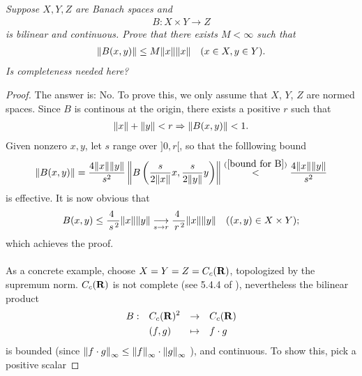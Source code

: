 \textit{
Suppose $X,Y,Z$ are Banach spaces and 
%
\begin{align*}
  B:X\times Y \to Z
\end{align*}
%
is bilinear and continuous. Prove that there exists $M<\infty$ such that 
%
\begin{align*}
  \norm{B(x, y)}
  \leq 
  M \norm{x}\norm{x} \quad (x\in X, y\in Y).
\end{align*}
%
Is completeness needed here?}
\begin{proof}%
The answer is: No. To prove this, we only assume that %
%
  $\mathit{X}$, $\mathit{Y}$, $\mathit{Z}$ %
%
are normed spaces. %
%
Since $B$ is continous at the origin, there exists a positive $r$ %
such that %
%
\begin{align}\label{bound for B}
  \norm{x} + \norm{y} < r \Rightarrow %
  \norm{B(x, y)} < 1.
\end{align}
%
%
Given nonzero $\mathit{x}, \mathit{y}$, let $s$ range over $]0, r[$, so that the folllowing bound %
%
\begin{align}
  \norm{B(x, y)} = \frac{4\norm{x}\norm{y}}{s^2} %
    \left\|
      B \left(\frac{s}{2\norm{x}}x, \frac{s}{2\norm{y}}y \right)
    \right\|
  \overset{(\ref{bound for B})}{<} \frac{4 \norm{x} \norm{y}}{s^2}
\end{align}
is effective. %
It is now obvious that %
%
\begin{align}
    B(x, y) \leq %
    \frac{\!\!\!4\!}{\,s^{\,2}}\norm{x}\norm{y} 
    \tendsto{s}{r}
    \frac{\!\!\!4\!}{\,r^{\,2}}\norm{x}\norm{y}
    \quad ((x, y) \in X \times Y); 
\end{align}
%
which achieves the proof.\\\\ %
As a concrete example, choose %
%
  $X = Y = Z = C_c({\mathbf R})$, %
%
topologized by the supremum norm. %
%
$C_c({\mathbf R})$ is not complete %
%
(see 5.4.4 of \cite{AnalyseIII}), %
%
nevertheless the bilinear product %
%
\begin{align}
  \begin{aligned}
    B: &&& C_c({\mathbf R})^{2} & \to      &&& C_c({\mathbf R}) \\\nonumber 
      &&& (f, g)       & \mapsto  &&& f \cdot g
  \end{aligned}
\end{align}
%
is bounded (since %
    $\norm{f\cdot g}_{\infty} \leq \norm{f}_{\infty}\cdot \norm{g}_{\infty}$%
), %
and continuous. To show this, pick a positive scalar %

\end{proof}
